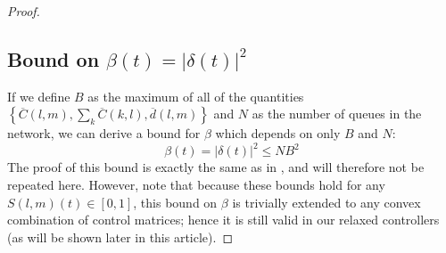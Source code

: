 \begin{proof}
\subsection*{Bound on $\beta(t) = \vert \delta (t)\vert^{2}$}
%
If we define $B$ as the maximum of all of the quantities $\left\{ \overline{C}(l,m), \sum_{k} \overline{C}(k,l),  \overline d (l,m) \right\}$ and $N$ as the number of queues in the network, we can derive a bound for $\beta$ which depends on only $B$ and $N$: 
\begin{equation}\label{betabound}
\beta(t)  = \big| \delta(t) \big|^2 \leq NB^2 
\end{equation}
The proof of this bound is exactly the same as in \cite{MaxPressureStochastic}, and will therefore not be repeated here. However, note that because these bounds hold for any $S(l,m)(t) \in [0,1]$, this bound on $\beta$ is trivially extended to any convex combination of control matrices; hence it is still valid in our relaxed controllers {\color{red}(as will be shown later in this article)}.


\end{proof}
